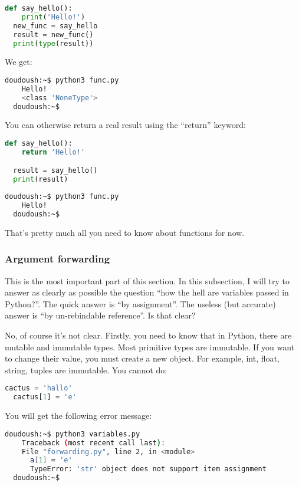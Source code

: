 \begin{lstlisting}[language=python]
  def say_hello():
    print('Hello!')
  new_func = say_hello
  result = new_func()
  print(type(result))
\end{lstlisting}

We get:
\begin{lstlisting}[language=bash]
  doudoush:~$ python3 func.py
    Hello!
    <class 'NoneType'>
  doudoush:~$
\end{lstlisting}

You can otherwise return a real result using the ``return'' keyword:

\begin{lstlisting}[language=python]
  def say_hello():
    return 'Hello!'

  result = say_hello()
  print(result)
\end{lstlisting}

\begin{lstlisting}[language=bash]
  doudoush:~$ python3 func.py
    Hello!
  doudoush:~$
\end{lstlisting}

That's pretty much all you need to know about functions for now.

\subsubsection{Argument forwarding}

This is the most important part of this section. In this subsection, I will
try to answer as clearly as possible the question ``how the hell are variables
passed in Python?''. The quick answer is ``by assignment''. The useless (but accurate)
answer is ``by un-rebindable reference''. Is that clear?

\vspace{5mm}

No, of course it's not clear. Firstly, you need to know that in
Python, there are mutable and immutable types. Most primitive types
are immutable. If you want to change their value, you must create a
new object. For example, int, float, string, tuples are immutable. You
cannot do:

\begin{lstlisting}[language=python]
  cactus = 'hallo'
  cactus[1] = 'e'
\end{lstlisting}

You will get the following error message:

\begin{lstlisting}[language=bash]
  doudoush:~$ python3 variables.py
    Traceback (most recent call last):
    File "forwarding.py", line 2, in <module>
      a[1] = 'e'
      TypeError: 'str' object does not support item assignment
  doudoush:~$
\end{lstlisting}

